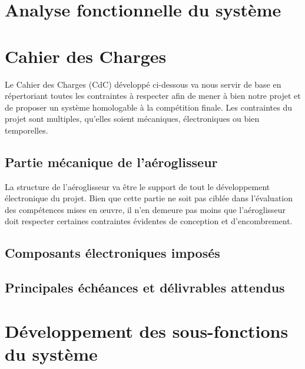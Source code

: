 \documentclass[a4paper,12pt]{report}
\begin{document}
	\section{Analyse fonctionnelle du système}
	
	
	
	\section{Cahier des Charges}
	
	Le Cahier des Charges (CdC) développé ci-dessous va nous servir de base en répertoriant toutes les contraintes à respecter afin de mener à bien notre projet et de proposer un système homologable à la compétition finale. Les contraintes du projet sont multiples, qu'elles soient mécaniques, électroniques ou bien temporelles.
	
		\subsection{Partie mécanique de l'aéroglisseur}
		
		La structure de l'aéroglisseur va être le support de tout le développement électronique du projet. Bien que cette partie ne soit pas ciblée dans l'évaluation des compétences mises en œuvre, il n'en demeure pas moins que l'aéroglisseur doit respecter certaines contraintes évidentes de conception et d'encombrement.
		
		
		\subsection{Composants électroniques imposés}
		
		\subsection{Principales échéances et délivrables attendus}
		
	
	\section{Développement des sous-fonctions du système}
	
		
\end{document}
